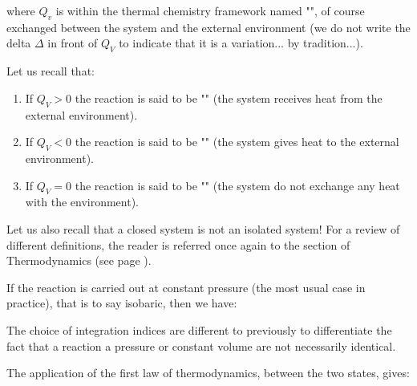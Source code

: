 	where $Q_v$ is within the thermal chemistry framework named "", of course exchanged between the system and the external environment (we do not write the delta $\Delta$ in front of $Q_V$ to indicate that it is a variation... by tradition...).
	
	Let us recall that:
	
	\begin{enumerate}
		\item If $Q_V>0$ the reaction is said to be "" (the system receives heat from the external environment).
		
		\item If $Q_V<0$ the reaction is said to be "" (the system gives heat to the external environment).
		
		\item If $Q_V=0$ the reaction is said to be "" (the system do not exchange any heat with the environment).
	\end{enumerate}
	\begin{tcolorbox}[title=Remark,arc=10pt,breakable,drop lifted shadow,
  skin=enhanced,
  skin first is subskin of={enhancedfirst}{arc=10pt,no shadow},
  skin middle is subskin of={enhancedmiddle}{arc=10pt,no shadow},
  skin last is subskin of={enhancedlast}{drop lifted shadow}]
	Let us also recall that a closed system is not an isolated system! For a review of different definitions, the reader is referred once again to the section of Thermodynamics (see page \pageref{thermodynamics}).
	\end{tcolorbox}
	
	If the reaction is carried out at constant pressure (the most usual case in practice), that is to say isobaric, then we have:
	
	\begin{tcolorbox}[title=Remark,arc=10pt,breakable,drop lifted shadow,
  skin=enhanced,
  skin first is subskin of={enhancedfirst}{arc=10pt,no shadow},
  skin middle is subskin of={enhancedmiddle}{arc=10pt,no shadow},
  skin last is subskin of={enhancedlast}{drop lifted shadow}]
	The choice of integration indices are different to previously to differentiate the fact that a reaction a pressure or constant volume are not necessarily identical.
	\end{tcolorbox}
	
	The application of the first law of thermodynamics, between the two states, gives:
	
